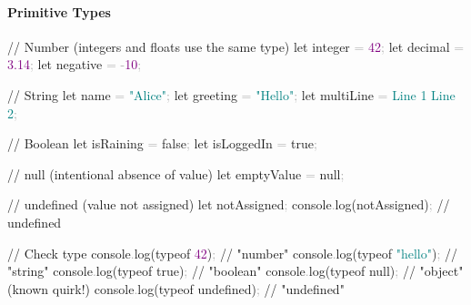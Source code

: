 \documentclass[
  justified,
  openright,
]{tufte-book}
\let\subsubsection\paragraph
\let\paragraph\paragraph
\newcommand{\BuiltInTok}[1]{#1}
\newcommand{\CommentTok}[1]{\textcolor{MidGray}{#1}}
\newcommand{\DecValTok}[1]{\textcolor{Purple}{#1}}
\newcommand{\FloatTok}[1]{\textcolor{Purple}{#1}}
\newcommand{\FunctionTok}[1]{\textcolor{BrandBlue}{#1}}
\newcommand{\KeywordTok}[1]{\textcolor{BrandBlue}{#1}}
\newcommand{\NormalTok}[1]{#1}
\newcommand{\OperatorTok}[1]{\textcolor{DarkGray}{#1}}
\newcommand{\StringTok}[1]{\textcolor{Teal}{#1}}
\newcommand{\VerbatimStringTok}[1]{\textcolor{Teal}{#1}}
\newenvironment{Shaded}{%
  \begin{snugshade}
}{%
  \end{snugshade}
}
\let\subsubsection\paragraph
\let\paragraph\paragraph
\begin{document}
\subsubsection{Primitive Types}\label{primitive-types}

\begin{Shaded}
\begin{Highlighting}[]
\CommentTok{// Number (integers and floats use the same type)}
\KeywordTok{let}\NormalTok{ integer }\OperatorTok{=} \DecValTok{42}\OperatorTok{;}
\KeywordTok{let}\NormalTok{ decimal }\OperatorTok{=} \FloatTok{3.14}\OperatorTok{;}
\KeywordTok{let}\NormalTok{ negative }\OperatorTok{=} \OperatorTok{{-}}\DecValTok{10}\OperatorTok{;}

\CommentTok{// String}
\KeywordTok{let}\NormalTok{ name }\OperatorTok{=} \StringTok{"Alice"}\OperatorTok{;}
\KeywordTok{let}\NormalTok{ greeting }\OperatorTok{=} \StringTok{"Hello"}\OperatorTok{;}
\KeywordTok{let}\NormalTok{ multiLine }\OperatorTok{=} \VerbatimStringTok{\textasciigrave{}Line 1}
\VerbatimStringTok{Line 2\textasciigrave{}}\OperatorTok{;}

\CommentTok{// Boolean}
\KeywordTok{let}\NormalTok{ isRaining }\OperatorTok{=} \KeywordTok{false}\OperatorTok{;}
\KeywordTok{let}\NormalTok{ isLoggedIn }\OperatorTok{=} \KeywordTok{true}\OperatorTok{;}

\CommentTok{// null (intentional absence of value)}
\KeywordTok{let}\NormalTok{ emptyValue }\OperatorTok{=} \KeywordTok{null}\OperatorTok{;}

\CommentTok{// undefined (value not assigned)}
\KeywordTok{let}\NormalTok{ notAssigned}\OperatorTok{;}
\BuiltInTok{console}\OperatorTok{.}\FunctionTok{log}\NormalTok{(notAssigned)}\OperatorTok{;} \CommentTok{// undefined}

\CommentTok{// Check type}
\BuiltInTok{console}\OperatorTok{.}\FunctionTok{log}\NormalTok{(}\KeywordTok{typeof} \DecValTok{42}\NormalTok{)}\OperatorTok{;} \CommentTok{// "number"}
\BuiltInTok{console}\OperatorTok{.}\FunctionTok{log}\NormalTok{(}\KeywordTok{typeof} \StringTok{"hello"}\NormalTok{)}\OperatorTok{;} \CommentTok{// "string"}
\BuiltInTok{console}\OperatorTok{.}\FunctionTok{log}\NormalTok{(}\KeywordTok{typeof} \KeywordTok{true}\NormalTok{)}\OperatorTok{;} \CommentTok{// "boolean"}
\BuiltInTok{console}\OperatorTok{.}\FunctionTok{log}\NormalTok{(}\KeywordTok{typeof} \KeywordTok{null}\NormalTok{)}\OperatorTok{;} \CommentTok{// "object" (known quirk!)}
\BuiltInTok{console}\OperatorTok{.}\FunctionTok{log}\NormalTok{(}\KeywordTok{typeof} \KeywordTok{undefined}\NormalTok{)}\OperatorTok{;} \CommentTok{// "undefined"}
\end{Highlighting}
\end{Shaded}
\end{document}
